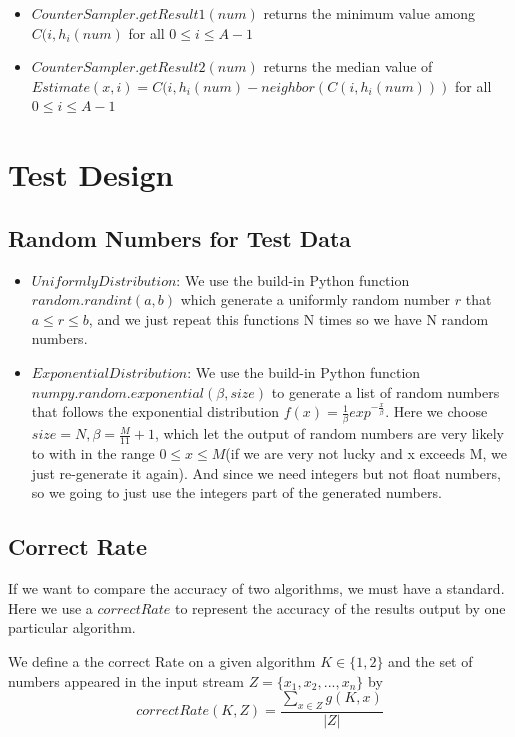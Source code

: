 \documentclass{article}
\begin{document}
\begin{itemize}
\item $CounterSampler.getResult1(num)$ returns the minimum value among $C(i,h_i(num)$ for all $0\leq i\leq A-1$
\item $CounterSampler.getResult2(num)$ returns the median value of $Estimate(x,i)=C(i,h_i(num) - neighbor(C(i,h_i(num)))$ for all $0\leq i\leq A-1$
\end{itemize}



\section{Test Design}

\subsection{Random Numbers for Test Data}
\begin{itemize}
\item $Uniformly Distribution$: We use the build-in Python function $random.randint(a,b)$ which generate a uniformly random number $r$ that $a \leq r \leq b$, and we just repeat this functions N times so we have N random numbers.
\item $Exponential Distribution$: We use the build-in Python function $numpy.random.exponential(\beta, size)$ to generate a list of random numbers that follows the exponential distribution $f(x)=\frac{1}{\beta}exp^{-\frac{x}{\beta}}$. Here we choose $size = N, \beta = \frac{M}{11}+1$, which let the output of random numbers are very likely to with in the range $0 \leq x \leq M$(if we are very not lucky and x exceeds M, we just re-generate it again). And since we need integers but not float numbers, so we going to just use the integers part of the generated numbers.
\end{itemize}

\subsection{Correct Rate}
If we want to compare the accuracy of two algorithms, we must have a standard. Here we use a $correctRate$ to represent the accuracy of the results output by one particular algorithm.

We define a the correct Rate on a given algorithm $K\in\{1,2\}$ and the set of numbers appeared in the input stream $Z = \{x_1, x_2, ..., x_n\}$ by 
\begin{equation}
	correctRate(K, Z) = \dfrac{\sum_{x\in Z} g(K, x)}{|Z|}
\end{equation}
\end{document}

